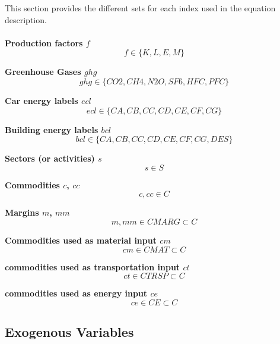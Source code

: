 \documentclass[12pt]{article}
\numberwithin{equation}{section}
\begin{document}
This section provides the different sets for each index used in the equation description. \\ \\
\noindent \textbf{Production factors $f$} 
\begin{equation} f \in  \{ K,L,E,M \} \end{equation}

\noindent \textbf{Greenhouse Gases $ghg$} 
\begin{equation} ghg \in  \{ CO2, CH4, N2O, SF6, HFC, PFC\} \end{equation}

\noindent \textbf{Car energy labels $ecl$} 
\begin{equation} ecl \in  \{CA, CB, CC, CD, CE, CF, CG\} \end{equation}

\noindent \textbf{Building energy labels $bcl$} 
\begin{equation} bcl \in  \{CA, CB, CC, CD, CE, CF, CG, DES\} \end{equation}

\noindent \textbf{Sectors (or activities) $s$} 
\begin{equation} s \in S \end{equation}

\noindent \textbf{Commodities $c$, $cc$} 
\begin{equation} c, cc \in C \end{equation}

\noindent \textbf{Margins $m$, $mm$} 
\begin{equation} m, mm \in  CMARG \subset C \end{equation}

\noindent \textbf{Commodities used as material input $cm$} 
\begin{equation} cm \in  CMAT \subset C \end{equation}

\noindent \textbf{commodities used as transportation input $ct$} 
\begin{equation} ct \in  CTRSP \subset C \end{equation}

\noindent \textbf{commodities used as energy input $ce$} 
\begin{equation} ce \in  CE \subset C \end{equation}



\subsection{Exogenous Variables}
\end{document}
